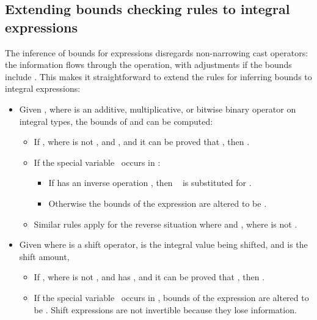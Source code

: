 \subsection{Extending bounds checking rules to integral
expressions}

The inference of bounds for expressions disregards non-narrowing cast operators:
the  information flows through the operation, with adjustments if the bounds
include \exprcurrentvalue.  This makes it straightforward to extend the
rules for inferring bounds to integral expressions:

\begin{itemize}
\item
  Given   , where  is an additive, multiplicative, or bitwise
  binary operator on integral types, the bounds of  and  can be
  computed:

  \begin{itemize}
  \item
    If , where  is not \boundsunknown, and 
    , and it can be proved that  , then
    .
  \item
    If the special variable \exprcurrentvalue\ occurs in :
    \begin{itemize}
    \item
      If  has an inverse operation , then 
      \exprcurrentvalue\   is substituted for \exprcurrentvalue.
    \item
      Otherwise the bounds of the expression are altered to be \boundsunknown.
    \end{itemize}
  \item
    Similar rules apply for the reverse situation where 
    and , where  is not \boundsunknown.
  \end{itemize}
\item
  Given    where  is a shift operator,  is the integral value
  being shifted, and  is the shift amount,

  \begin{itemize}
  \item
    If , where  is not \boundsunknown, and  has
    \boundsunknown, and it can be proved that  , then .
  \item
    If the special variable \exprcurrentvalue\ occurs in ,
    bounds of the expression are altered to be \boundsunknown. Shift
    expressions are not invertible because they lose information.
  \end{itemize}
\end{itemize}

